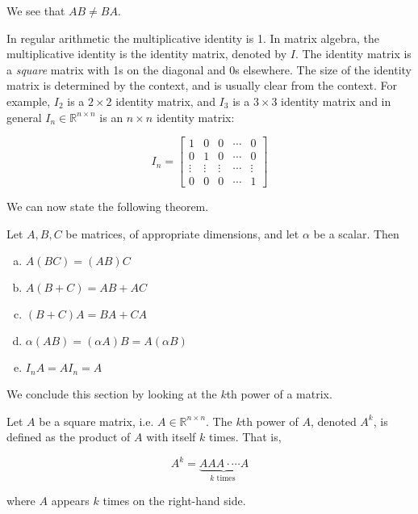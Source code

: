 \begin{solution}
    We see that $AB \neq BA$. \end{solution}

    In regular arithmetic the multiplicative identity is 1. In matrix algebra, the multiplicative identity is the identity matrix, denoted by $I$. The identity matrix is a \textit{square} matrix with 1s on the diagonal and 0s elsewhere. The size of the identity matrix is determined by the context, and is usually clear from the context. For example, $I_2$ is a $2 \times 2$ identity matrix, and $I_3$ is a $3 \times 3$ identity matrix and in general $I_n \in \mathbb{R}^{n \times n}$ is an $n \times n$ identity matrix:

    $$
    I_n=\left[\begin{array}{ccccc}
    1 & 0 & 0 & \cdots & 0 \\
    0 & 1 & 0 & \cdots & 0 \\
    \vdots & \vdots & \vdots & \cdots & \vdots \\
    0 & 0 & 0 & \cdots & 1
    \end{array}\right]
    $$

    We can now state the following theorem.

    \begin{theorem}
        Let $A, B, C$ be matrices, of appropriate dimensions, and let $\alpha$ be a scalar. Then
\begin{enumerate}[(a)]
    \item $A(BC) = (AB)C$
    \item $A(B + C) = AB + AC$
    \item $(B + C)A = BA + CA$
    \item $\alpha(AB) = (\alpha A)B = A(\alpha B)$
    \item $I_n A = AI_n = A$
\end{enumerate}
\end{theorem}

We conclude this section by looking at the $k$th power of a matrix.

\begin{definition}
    Let $A$ be a square matrix, i.e. $ A \in \mathbb{R}^{n \times n}$. The $k$th power of $A$, denoted $A^k$, is defined as the product of $A$ with itself $k$ times. That is,

    $$
    A^k=\underbrace{ AAA \cdot \cdots A}_{k \text { times }}
    $$

    where $A$ appears $k$ times on the right-hand side.
\end{definition}

